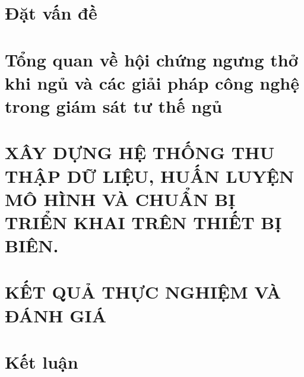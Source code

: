 \documentclass[12pt,a4paper,oneside]{book} %
\renewcommand\thechapter{\arabic{chapter}}
\begin{document}
\renewcommand{\thelstlisting}{\thechapter.\arabic{lstlisting}}

\renewcommand{\thedefinition}{\thechapter.\arabic{definition}}




\pagestyle{plain}
\frontmatter


\tableofcontents


\renewcommand{\listfigurename}{Danh sách hình vẽ}
\renewcommand{\listtablename}{Danh sách bảng}

\listoffigures
{}

\listoftables
{}


\mainmatter


\changefontsizes[16pt]{13pt}
\chapter*{Đặt vấn đề}
\thispagestyle{empty}


\chapter{Tổng quan về hội chứng ngưng thở khi ngủ và các giải pháp công nghệ trong giám sát tư thế ngủ \label{background_section}}


\chapter{XÂY DỰNG HỆ THỐNG THU THẬP DỮ LIỆU, HUẤN LUYỆN MÔ HÌNH VÀ 
CHUẨN BỊ TRIỂN KHAI TRÊN THIẾT BỊ BIÊN.\label{the_proposed_method_section}}


\chapter{KẾT QUẢ THỰC NGHIỆM VÀ ĐÁNH GIÁ}


% 
\chapter{Kết luận}



% 



% 



\newpage
\printbibliography
\end{document}
